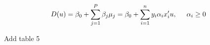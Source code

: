 \documentclass[conference]{IEEEtran}
\def\BibTeX{{\rm B\kern-.05em{\sc i\kern-.025em b}\kern-.08em
    T\kern-.1667em\lower.7ex\hbox{E}\kern-.125emX}}
\newcommand{\reviewUrgent}[1]{{\color{red} #1}} %
\begin{document}
\begin{equation}
    D(u)=\beta_0 + \sum_{j=1}^P \beta_j\mu_j = \beta_0+\sum_{i = 1}^ny_i\alpha_ix_i'u, \hspace{0.5cm} \alpha_i \geq 0 \label{eq19}
\end{equation}

\reviewUrgent{Add table 5}






\end{document}
